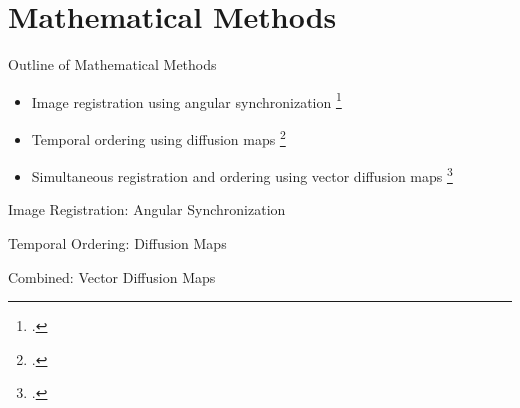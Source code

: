 \documentclass[10pt]{beamer}
\begin{document}
\section{Mathematical Methods}

\begin{frame}{Outline of Mathematical Methods}

\begin{itemize}

\item Image registration using angular synchronization \footcite{singer2011angular}

\item Temporal ordering using diffusion maps \footcite{coifman2005geometric}

\item Simultaneous registration and ordering using vector diffusion maps \footcite{singer2012vector}

\end{itemize}
\end{frame}

\begin{frame}{Image Registration: Angular Synchronization}

\end{frame}

\begin{frame}{Temporal Ordering: Diffusion Maps}

\end{frame}

\begin{frame}{Combined: Vector Diffusion Maps}


\end{frame}
\end{document}
